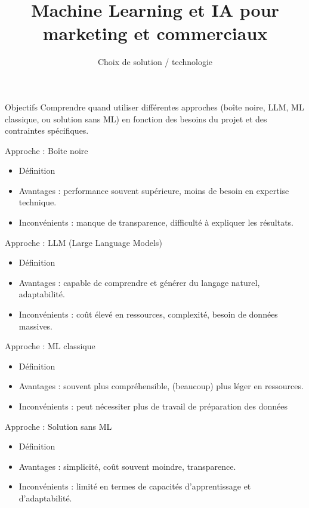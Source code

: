  \title{Machine Learning et IA pour marketing
et commerciaux} \subtitle{Choix de solution / technologie}



\begin{frame}
  \titlepage
\end{frame}

\begin{frame}{Objectifs}
  Comprendre quand utiliser différentes approches (boîte noire, LLM,
  ML classique, ou solution sans ML) en fonction des besoins du projet
  et des contraintes spécifiques.
\end{frame}

\begin{frame}{Approche : Boîte noire}
\begin{itemize}
    \item Définition
    \item Avantages : performance souvent supérieure, moins de besoin en expertise technique.
    \item Inconvénients : manque de transparence, difficulté à expliquer les résultats.
\end{itemize}
\end{frame}

\begin{frame}{Approche : LLM (Large Language Models)}
\begin{itemize}
    \item Définition
    \item Avantages : capable de comprendre et générer du langage naturel, adaptabilité.
    \item Inconvénients : coût élevé en ressources, complexité, besoin de données massives.
\end{itemize}
\end{frame}

\begin{frame}{Approche : ML classique}
\begin{itemize}
    \item Définition
    \item Avantages : souvent plus compréhensible, (beaucoup) plus léger en ressources.
    \item Inconvénients : peut nécessiter plus de travail de préparation des données
\end{itemize}
\end{frame}

\begin{frame}{Approche : Solution sans ML}
\begin{itemize}
    \item Définition
    \item Avantages : simplicité, coût souvent moindre, transparence.
    \item Inconvénients : limité en termes de capacités d'apprentissage et d'adaptabilité.
\end{itemize}
\end{frame}

